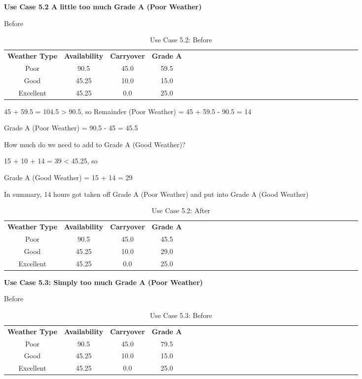 \documentclass{article}
\begin{document}
{\bf Use Case 5.2 A little too much Grade A (Poor Weather)}

Before

\begin{table}
{\footnotesize
\caption{Use Case 5.2: Before\label{tab:time}}
\begin{tabular*}{1.05\textwidth}{@{\extracolsep{\fill}}ccccccccccccccccccccccccccccc}

\hline \hline
{\bf Weather Type} & {\bf Availability} & {\bf Carryover} & {\bf Grade A}\\
Poor & 90.5 & 45.0 & 59.5\\
Good & 45.25 & 10.0 & 15.0\\
Excellent & 45.25 & 0.0 & 25.0\\
\hline \hline
\end{tabular*}
}
\end{table}

45 + 59.5 = 104.5 > 90.5, so 
Remainder (Poor Weather) = 45 + 59.5 - 90.5 = 14

Grade A (Poor Weather) = 90.5 - 45 = 45.5

How much do we need to add to Grade A (Good Weather)?

15 + 10 + 14 = 39 < 45.25, so

Grade A (Good Weather) = 15 + 14 = 29

In summary, 14 hours got taken off Grade A (Poor Weather) and put into Grade A (Good Weather) 

\begin{table}
{\footnotesize
\caption{Use Case 5.2: After\label{tab:time}}
\begin{tabular*}{1.05\textwidth}{@{\extracolsep{\fill}}ccccccccccccccccccccccccccccc}
\hline \hline
{\bf Weather Type} & {\bf Availability} & {\bf Carryover} & {\bf Grade A}\\
Poor & 90.5 & 45.0 & 45.5\\
Good & 45.25 & 10.0 & 29.0\\
Excellent & 45.25 & 0.0 & 25.0\\
\hline \hline
\end{tabular*}
}
\end{table}

{\bf Use Case 5.3: Simply too much Grade A (Poor Weather)}

Before

\begin{table}
{\footnotesize
\caption{Use Case 5.3: Before\label{tab:time}}
\begin{tabular*}{1.05\textwidth}{@{\extracolsep{\fill}}ccccccccccccccccccccccccccccc}
\hline \hline
{\bf Weather Type} & {\bf Availability} & {\bf Carryover} & {\bf Grade A}\\
Poor & 90.5 & 45.0 & 79.5\\
Good & 45.25 & 10.0 & 15.0\\
Excellent & 45.25 & 0.0 & 25.0\\
\hline \hline
\end{tabular*}
}
\end{table}
\end{document}
